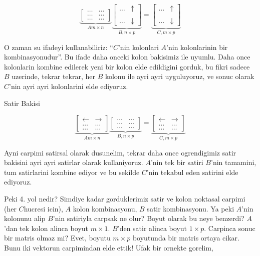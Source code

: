\documentclass[12pt,fleqn]{article}\usepackage{../common}
\begin{document}
$$ 
\underbrace{
\left[\begin{array}{rr}
\dots & \dots   \\
\dots & \dots   \\
\dots & \dots 
\end{array}\right]
}_{A m \times n}
\underbrace{
\left[\begin{array}{rr}
\dots & \uparrow \\
& \\
\dots & \downarrow
\end{array}\right] 
}_{B, n \times p}
=
\underbrace{
\left[\begin{array}{rr}
\dots & \uparrow \\
& \\
\dots & \downarrow
\end{array}\right] 
}_{C, m \times p}
$$

O zaman su ifadeyi kullanabiliriz: ``$C$'nin kolonlari $A$'nin kolonlarinin
bir kombinasyonudur''. Bu ifade daha onceki kolon bakisimiz ile
uyumlu. Daha once kolonlarin kombine edilerek yeni bir kolon elde
edildigini gorduk, bu fikri sadece $B$ uzerinde, tekrar tekrar, her $B$
kolonu ile ayri ayri uyguluyoruz, ve sonuc olarak $C$'nin ayri ayri
kolonlarini elde ediyoruz.

Satir Bakisi

$$ 
\underbrace{
\left[\begin{array}{rr}
\leftarrow  & \rightarrow  \\
\dots & \dots \\
\dots & \dots 
\end{array}\right]
}_{A m \times n}
\underbrace{
\left[\begin{array}{rr}
\dots & \dots \\
\dots & \dots \\
\dots & \dots
\end{array}\right] 
}_{B, n \times p}
=
\underbrace{
\left[\begin{array}{rr}
\leftarrow  & \rightarrow  \\
\dots & \dots  \\
\dots & \dots 
\end{array}\right] 
}_{C, m \times p}
$$

Ayni carpimi satirsal olarak dusunelim, tekrar daha once ogrendigimiz satir
bakisini ayri ayri satirlar olarak kullaniyoruz. $A$'nin tek bir satiri
$B$'nin tamamini, tum satirlarini kombine ediyor ve bu sekilde $C$'nin
tekabul eden satirini elde ediyoruz. 

Peki 4. yol nedir? Simdiye kadar gorduklerimiz satir ve kolon noktasal
carpimi (her $C$hucresi icin), $A$ kolon kombinasyonu, $B$ satir
kombinasyonu. Ya peki $A$'nin kolonunu alip $B$'nin satiriyla carpsak ne
olur? Boyut olarak bu neye benzerdi? $A$'dan tek kolon alinca boyut $m
\times 1$. $B$'den satir alinca boyut $1 \times p$. Carpinca sonuc bir
matris olmaz mi? Evet, boyutu $m \times p$ boyutunda bir matris ortaya
cikar. Bunu iki vektorun carpimindan elde ettik! Ufak bir ornekte gorelim, 
\end{document}
